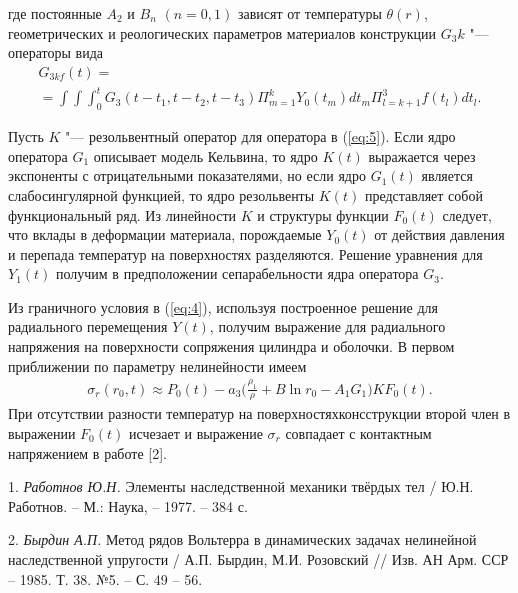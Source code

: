 \noindent где постоянные $A_2$ и $B_n$ $(n=0,1)$ зависят от температуры $\theta(r)$,
геометрических и реологических параметров материалов конструкции $G_3k$ "--- операторы вида
\begin{equation*}
    \begin{gathered}
        G_{3kf}(t)= \\
        =\int\!\!\int\!\!\int^{t}_{0}G_3(t-t_1,t-t_2,t-t_3)\Pi^k_{m=1}Y_0(t_m)dt_m\Pi^3_{l=k+1}f(t_l)dt_l.
    \end{gathered}
\end{equation*}


Пусть $K$ "--- резольвентный оператор для оператора в (\ref{eq:5}). Если ядро оператора $G_1$ описывает модель Кельвина, то ядро $K(t)$ выражается через экспоненты с отрицательными показателями,
но если ядро $G_1(t)$ является слабосингулярной функцией, то ядро резольвенты $K(t)$ представляет собой функциональный ряд.
Из линейности $K$ и структуры функции $F_0(t)$ следует, что вклады в деформации материала, порождаемые $Y_0(t)$ от действия давления и перепада температур на поверхностях разделяются.
Решение уравнения для $Y_1(t)$ получим в предположении сепарабельности ядра оператора $G_3$.

Из граничного условия в (\ref{eq:4}), используя построенное решение для радиального перемещения $Y(t)$, получим выражение для радиального напряжения на поверхности сопряжения цилиндра и оболочки. В первом приближении по параметру нелинейности имеем
\begin{equation}\label{eq:6}
    \begin{gathered}
        \sigma_r(r_0,t)\approx P_0(t)-a_3\bigg(\frac{\rho_1}{\rho}+B\ln r_0-A_1G_1\bigg)KF_0(t).
    \end{gathered}
\end{equation}
При отсутствии разности температур на поверхностях\linebreak консструкции второй член в выражении $F_0(t)$ исчезает и выражение $\sigma_r$ совпадает с контактным напряжением в работе [2].


\litlist

1. {\it Работнов Ю.Н.} Элементы наследственной механики твёрдых тел / Ю.Н. Работнов. – М.: Наука, – 1977. – 384 с.

2. {\it Бырдин А.П.} Метод рядов Вольтерра в динамических задачах  нелинейной наследственной упругости /  А.П. Бырдин, М.И. Розовский // Изв. АН Арм. ССР – 1985. Т. 38. №5. – С. 49 – 56.
